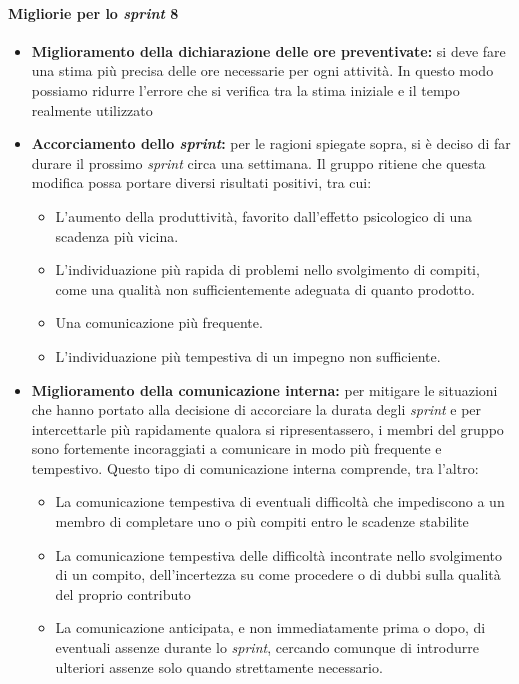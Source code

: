 \documentclass[12pt, a4paper]{article}
\begin{document}
{\paragraph{Migliorie per lo \textit{sprint} 8}
\begin{itemize}
    \item \textbf{Miglioramento della dichiarazione delle ore preventivate:} si deve fare una stima più precisa delle ore necessarie per ogni attività. In questo modo possiamo ridurre l'errore che si verifica tra la stima iniziale e il tempo realmente utilizzato
    \item \textbf{Accorciamento dello \textit{sprint}:} per le ragioni spiegate sopra, si è deciso di far durare il prossimo \textit{sprint} circa una settimana. Il gruppo ritiene che questa modifica possa portare diversi risultati positivi, tra cui:
    \begin{itemize}
        \item L'aumento della produttività, favorito dall'effetto psicologico di una scadenza più vicina.
        \item L'individuazione più rapida di problemi nello svolgimento di compiti, come una qualità non sufficientemente adeguata di quanto prodotto.
        \item Una comunicazione più frequente.
        \item L'individuazione più tempestiva di un impegno non sufficiente.
    \end{itemize}
    \item \textbf{Miglioramento della comunicazione interna:} per mitigare le situazioni che hanno portato alla decisione di accorciare la durata degli \textit{sprint} e per intercettarle più rapidamente qualora si ripresentassero, i membri del gruppo sono fortemente incoraggiati a comunicare in modo più frequente e tempestivo. Questo tipo di comunicazione interna comprende, tra l'altro:
    \begin{itemize}
        \item La comunicazione tempestiva di eventuali difficoltà che impediscono a un membro di completare uno o più compiti entro le scadenze stabilite
        \item La comunicazione tempestiva delle difficoltà incontrate nello svolgimento di un compito, dell'incertezza su come procedere o di dubbi sulla qualità del proprio contributo
        \item La comunicazione anticipata, e non immediatamente prima o dopo, di eventuali assenze durante lo \textit{sprint}, cercando comunque di introdurre ulteriori assenze solo quando strettamente necessario.
    \end{itemize}
\end{itemize}


}
\end{document}
